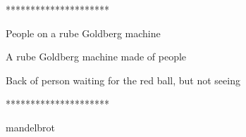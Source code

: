 
*********************

People on a rube Goldberg machine

A rube Goldberg machine made of people 

Back of person waiting for the red ball, but not seeing 

*********************

mandelbrot

